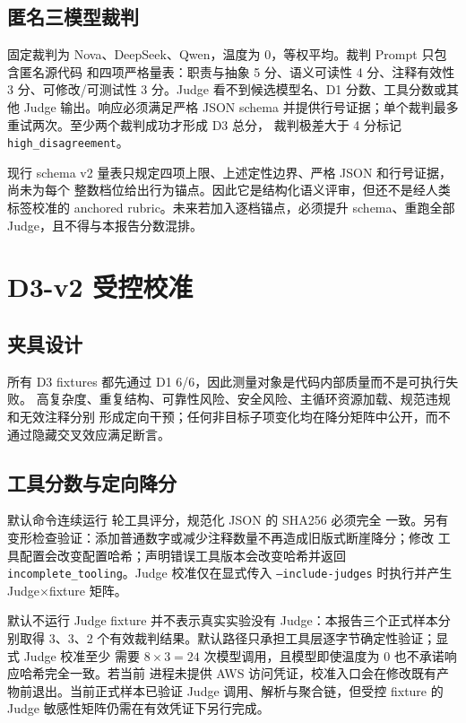 \documentclass[UTF8,zihao=-4,fontset=fandol]{ctexart}
\begin{document}
\subsection{匿名三模型裁判}

固定裁判为 Nova、DeepSeek、Qwen，温度为 0，等权平均。裁判 Prompt 只包含匿名源代码
和四项严格量表：职责与抽象 5 分、语义可读性 4 分、注释有效性 3 分、可修改/可测试性
3 分。Judge 看不到候选模型名、D1 分数、工具分数或其他 Judge 输出。响应必须满足严格
JSON schema 并提供行号证据；单个裁判最多重试两次。至少两个裁判成功才形成 D3 总分，
裁判极差大于 4 分标记 \texttt{high\_disagreement}。

现行 schema v2 量表只规定四项上限、上述定性边界、严格 JSON 和行号证据，尚未为每个
整数档位给出行为锚点。因此它是结构化语义评审，但还不是经人类标签校准的 anchored
rubric。未来若加入逐档锚点，必须提升 schema、重跑全部 Judge，且不得与本报告分数混排。

\section{D3-v2 受控校准}

\subsection{夹具设计}

所有 D3 fixtures 都先通过 D1 6/6，因此测量对象是代码内部质量而不是可执行失败。
高复杂度、重复结构、可靠性风险、安全风险、主循环资源加载、规范违规和无效注释分别
形成定向干预；任何非目标子项变化均在降分矩阵中公开，而不通过隐藏交叉效应满足断言。



\subsection{工具分数与定向降分}





默认命令连续运行 \DThreeToolRepeatCount 轮工具评分，规范化 JSON 的 SHA256 必须完全
一致。另有变形检查验证：添加普通数字或减少注释数量不再造成旧版式断崖降分；修改
工具配置会改变配置哈希；声明错误工具版本会改变哈希并返回
\texttt{incomplete\_tooling}。Judge 校准仅在显式传入
\texttt{--include-judges} 时执行并产生 Judge$\times$fixture 矩阵。

默认不运行 Judge fixture 并不表示真实实验没有 Judge：本报告三个正式样本分别取得
3、3、2 个有效裁判结果。默认路径只承担工具层逐字节确定性验证；显式 Judge 校准至少
需要 $8\times3=24$ 次模型调用，且模型即使温度为 0 也不承诺响应哈希完全一致。若当前
进程未提供 AWS 访问凭证，校准入口会在修改既有产物前退出。当前正式样本已验证 Judge
调用、解析与聚合链，但受控 fixture 的 Judge 敏感性矩阵仍需在有效凭证下另行完成。
\end{document}
